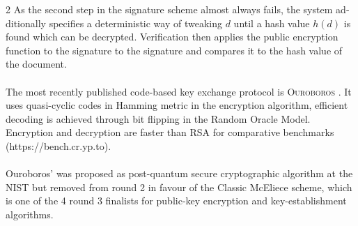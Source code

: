 \documentclass[a4paper,11pt]{article}
\begin{document}
\begin{otherlanguage}{english}
\begin{multicols}{2}
\vspace{0.4cm}
\noindent
As the second step in the signature scheme almost always fails, the system additionally specifies a deterministic way of tweaking $d$ until a hash value $h(d)$ is found which can be decrypted. Verification then applies the public encryption function to the signature to the signature and compares it to the hash value of the document. \\
\\
The most recently published code-based key exchange protocol is \textsc{Ouroboros} \cite{OUR}. It uses quasi-cyclic codes in Hamming metric in the encryption algorithm, efficient decoding is achieved through bit flipping in the Random Oracle Model. Encryption and decryption are faster than RSA for comparative benchmarks (https://bench.cr.yp.to). \\ \\
Ouroboros' was  proposed as post-quantum secure cryptographic algorithm at the NIST but removed from round 2 in favour of the Classic McEliece scheme, which is one of the 4 round 3 finalists for public-key encryption and key-establishment algorithms.


\end{multicols}
\end{otherlanguage}
\end{document}
